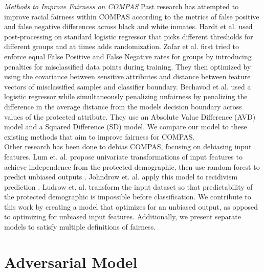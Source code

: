 \documentclass{article}
\begin{document}
\textit{Methods to Improve Fairness on COMPAS} Past research has attempted to improve racial fairness within COMPAS according to the metrics of false positive and false negative differences across black and white inmates. Hardt et al.  used post-processing on standard logistic regressor that picks different thresholds for different groups and at times adds randomization. Zafar et al.  first tried to enforce equal False Positive and False Negative rates for groups by introducing penalties for misclassified data points during training. They then optimized by using the covariance between sensitive attributes and distance between feature vectors of misclassified samples and classifier boundary. Bechavod et al.  used a logistic regressor while simultaneously penalizing unfairness by penalizing the difference in the average distance from the model\textquotesingle s decision boundary across values of the protected attribute. They use an Absolute Value Difference (AVD) model and a Squared Difference (SD) model. We compare our model to these existing methods that aim to improve fairness for COMPAS. \\
Other research has been done to debias COMPAS, focusing on debiasing input features. Lum et. al. propose univariate transformations of input features to achieve independence from the protected demographic, then use random forest to predict unbiased outputs . Johndrow et. al. apply this model to recidivism prediction . Ludrow et. al. transform the input dataset so that predictability of the protected demographic is impossible before classification. We contribute to this work by creating a model that optimizes for an unbiased output, as opposed to optimizing for unbiased input features. Additionally, we present separate models to satisfy multiple definitions of fairness.
\vspace{-2mm}
\section{Adversarial Model}

\end{document}
